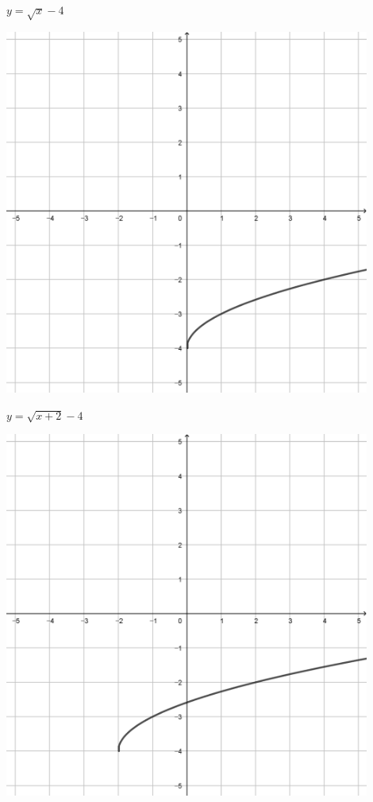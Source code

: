 \documentclass[a4paper]{oblivoir}
\begin{document}
\begin{minipage}{0.45\textwidth}\centering
\(y=\sqrt{x}-4\)
\par\bigskip\includegraphics[width=0.9\textwidth]{img/24-3}
\end{minipage}
\begin{minipage}{0.45\textwidth}\centering
\(y=\sqrt{x+2}-4\)
\par\bigskip\includegraphics[width=0.9\textwidth]{img/24-4}
\end{minipage}\bigskip\bigskip\par
\end{document}
